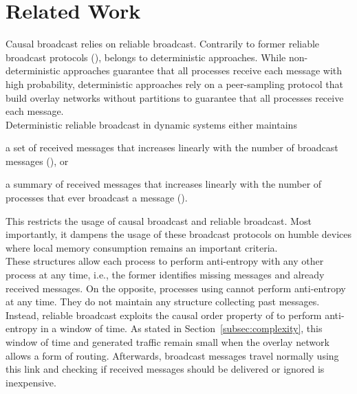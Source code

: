 
\section{Related Work}
\label{sec:relatedwork}





Causal broadcast relies on reliable broadcast. 
Contrarily to former reliable broadcast protocols (\REF), \RPCBROADCAST belongs
to deterministic approaches. While non-deterministic approaches guarantee that
all processes receive each message with high probability, deterministic
approaches rely on a peer-sampling protocol that build overlay networks without
partitions to guarantee that all processes receive each message. \\
Deterministic reliable broadcast in dynamic systems either maintains
\begin{inparaenum}[(i)]
\item a set of received messages that increases linearly with the number of
  broadcast messages (\REF), or
\item a summary of received messages that increases linearly with the number of
  processes that ever broadcast a message (\REF). 
\end{inparaenum}
This restricts the usage of causal broadcast and reliable broadcast. Most
importantly, it dampens the usage of these broadcast protocols on humble devices
where local memory consumption remains an important criteria. \\
These structures allow each process to perform anti-entropy with any other
process at any time, i.e., the former identifies missing messages and already
received messages. On the opposite, processes using \RPCBROADCAST cannot perform
anti-entropy at any time. They do not maintain any structure collecting past
messages. Instead, reliable broadcast exploits the causal order property of
\RPCBROADCAST to perform anti-entropy in a window of time. As stated in
Section~\ref{subsec:complexity}, this window of time and generated traffic
remain small when the overlay network allows a form of routing. Afterwards,
broadcast messages travel normally using this link and checking if received
messages should be delivered or ignored is inexpensive.



